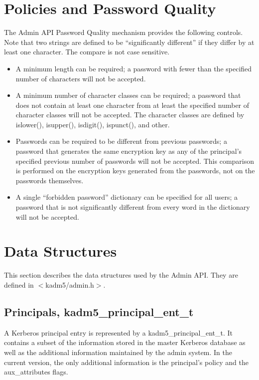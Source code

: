 \section{Policies and Password Quality}

The Admin API Password Quality mechanism provides the following
controls.  Note that two strings are defined to be ``significantly
different'' if they differ by at least one character. The compare is not
case sensitive.

\begin{itemize}
\item A minimum length can be required; a password with
fewer than the specified number of characters will not be accepted.

\item A minimum number of character classes can be required; a
password that does not contain at least one character from at least
the specified number of character classes will not be accepted.  The
character classes are defined by islower(), isupper(), isdigit(),
ispunct(), and other.

\item Passwords can be required to be different from
previous passwords; a password that generates the same encryption key
as any of the principal's specified previous number of passwords will
not be accepted.  This comparison is performed on the encryption keys
generated from the passwords, not on the passwords themselves.

\item A single ``forbidden password'' dictionary can be specified for all
users; a password that is not significantly different from every word
in the dictionary will not be accepted.
\end{itemize}

\section{Data Structures}

This section describes the data structures used by the Admin API.
They are defined in $<$kadm5/admin.h$>$.

\subsection{Principals, kadm5_principal_ent_t}
\label{sec:principal-structure}

A Kerberos principal entry is represented by a kadm5_principal_ent_t.
It contains a subset of the information stored in the master Kerberos
database as well as the additional information maintained by the admin
system.  In the current version, the only additional information is
the principal's policy and the aux_attributes flags.

